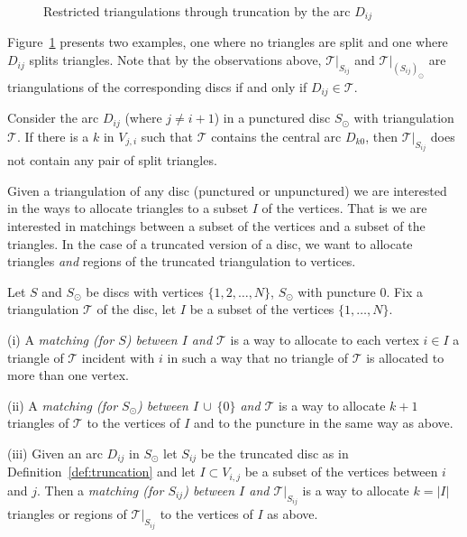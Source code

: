\documentclass[a4paper]{amsart}
\begin{document}
\begin{figure}
\begin{center}
\hfill
{}
\end{center}
\caption{Restricted triangulations through truncation by the arc
$D_{ij}$}
\label{fig:truncating}
\end{figure}

Figure~\ref{fig:truncating} presents two examples, one where
no triangles are split and one where $D_{ij}$ splits triangles.
Note that by the observations above, ${\mathcal T}|_{S_{ij}}$ and
${\mathcal T}|_{(S_{ij})_{\odot}}$
are triangulations of the corresponding discs if and only if
$D_{ij}\in{\mathcal T}$.

\begin{remark}\label{rem:splitting}
Consider the arc $D_{ij}$ (where $j\neq i+1$) in a
punctured disc $S_{\odot}$ with triangulation ${\mathcal T}$. If there is
a $k$ in $V_{j,i}$ such that ${\mathcal T}$ contains the central
arc $D_{k0}$, then ${\mathcal T}|_{S_{ij}}$ does not contain any pair of split
triangles.
\end{remark}

Given a triangulation of any disc (punctured or unpunctured) we
are interested in the ways to allocate triangles to a subset $I$
of the vertices. That is we are interested in matchings between a
subset of the vertices and a subset of the triangles. In the case
of a truncated version of a disc, we want to allocate triangles
{\em and} regions of the truncated triangulation to vertices.

\begin{definition}\label{def:matching}
Let $S$ and $S_{\odot}$ be discs with vertices
$\{1,2,\dots,N\}$, $S_{\odot}$ with puncture $0$. Fix a 
triangulation ${\mathcal T}$ of the disc, let $I$ be a subset of the vertices
$\{1,\dots,N\}$. 

(i) A {\em matching (for $S$) between $I$ and ${\mathcal T}$}
is a way to allocate to each vertex $i\in I$ a triangle of ${\mathcal T}$
incident with $i$ in such a way that no triangle of ${\mathcal T}$ is
allocated to more than one vertex.

(ii) A {\em matching (for $S_{\odot}$) between $I\,\cup\,\{0\}$
and ${\mathcal T}$} is a way to allocate $k+1$ triangles
of ${\mathcal T}$ to the vertices of
$I$ and to the puncture in the same way as above.

(iii) Given an arc $D_{ij}$ in $S_{\odot}$ let $S_{ij}$ be the
truncated disc as in Definition~\ref{def:truncation} and let
$I\subset V_{i,j}$ be a subset of the vertices between $i$
and $j$. Then a {\em matching (for $S_{ij}$) between
$I$ and ${\mathcal T}|_{S_{ij}}$} is a way to allocate $k=|I|$
triangles or regions of ${\mathcal T}|_{S_{ij}}$ to the vertices of $I$
as above.
\end{definition}
\end{document}
